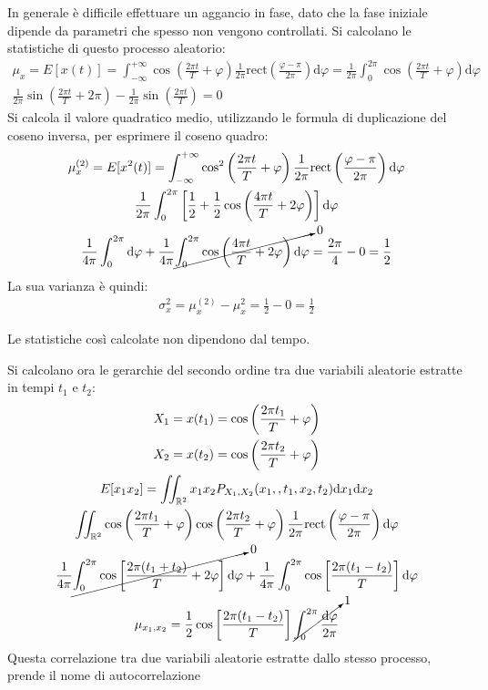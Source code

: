 \documentclass{article}
\newcommand{\rect}{\mathrm{rect}}
\newcommand{\df}{\mathrm{d}}
\numberwithin{equation}{subsection}
\begin{document}
In generale è difficile effettuare un aggancio in fase, dato che la fase iniziale dipende da parametri che spesso non vengono controllati. 
Si calcolano le statistiche di questo processo aleatorio:
\begin{gather*}
    \mu_{x}=E[x(t)]=\displaystyle\int_{-\infty}^{+\infty}\cos\left(\frac{2\pi t}{T}+\varphi\right)\frac{1}{2\pi}\rect\left(\frac{\varphi-\pi}{2\pi}\right)\df\varphi=\frac{1}{2\pi}\int_0^{2\pi}\cos\left(\frac{2\pi t}{T}+\varphi\right)\df\varphi\\
    \frac{1}{2\pi}\sin\left(\frac{2\pi t}{T}+2\pi\right)-\frac{1}{2\pi}\sin\left(\frac{2\pi t}{T}\right)=0
\end{gather*}
Si calcola il valore quadratico medio, utilizzando le formula di duplicazione del coseno inversa, per esprimere il coseno quadro:
\begin{gather*}
    \mu_{x}^{(2)}=E[x^2(t)]=\displaystyle\int_{-\infty}^{+\infty}\cos^2\left(\frac{2\pi t}{T}+\varphi\right)\frac{1}{2\pi}\rect\left(\frac{\varphi-\pi}{2\pi}\right)\df\varphi\\
    \frac{1}{2\pi}\int_0^{2\pi}\left[\frac{1}{2}+\frac{1}{2}\cos\left(\frac{4\pi t}{T}+2\varphi\right)\right]\df\varphi\\
    \frac{1}{4\pi}\int_0^{2\pi}\df\varphi+\frac{1}{4\pi}\cancelto{0}{\int_0^{2\pi}\cos\left(\frac{4\pi t}{T}+2\varphi\right)\df\varphi}=\frac{2\pi}{4}-0=\frac{1}{2}
\end{gather*}
La sua varianza è quindi:
\begin{gather*}
    \sigma_x^2=\mu_x^{(2)}-\mu_x^2=\displaystyle\frac{1}{2}-0=\frac{1}{2}
\end{gather*}

Le statistiche così calcolate non dipendono dal tempo. 

Si calcolano ora le gerarchie del secondo ordine tra due variabili aleatorie estratte in tempi $t_1$ e $t_2$:
\begin{gather*}
    X_1=x(t_1)=\displaystyle\cos\left(\frac{2\pi t_1}{T}+\varphi\right)\\
    X_2=x(t_2)=\displaystyle\cos\left(\frac{2\pi t_2}{T}+\varphi\right)\\
    E[x_1x_2]=\displaystyle\iint_{\mathbb{R}^2}x_1x_2P_{X_1,X_2}(x_1,,t_1,x_2,t_2)\df x_1\df x_2\\
    \displaystyle\iint_{\mathbb{R}^2}\cos\left(\frac{2\pi t_1}{T}+\varphi\right)\cos\left(\frac{2\pi t_2}{T}+\varphi\right)\frac{1}{2\pi}\rect\left(\frac{\varphi-\pi}{2\pi}\right)\df\varphi\\
    \displaystyle\frac{1}{4\pi}\cancelto{0}{\int_{0}^{2\pi}\cos\left[\frac{2\pi(t_1+t_2)}{T}+2\varphi\right]\df\varphi}+\frac{1}{4\pi}\int_{0}^{2\pi}\cos\left[\frac{2\pi(t_1-t_2)}{T}\right]\df\varphi\\
    \mu_{x_1,x_2}=\displaystyle\frac{1}{2}\cos\left[\frac{2\pi(t_1-t_2)}{T}\right]\cancelto{1}{\int_0^{2\pi}\frac{\df\varphi}{2\pi}}
\end{gather*}
Questa correlazione tra due variabili aleatorie estratte dallo stesso processo, prende il nome di autocorrelazione
\end{document}
